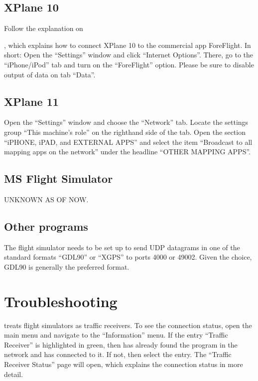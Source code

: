 \documentclass[letterpaper,10pt,english]{sphinxmanual}
\begin{document}
\subsection{X\sphinxhyphen{}Plane 10}
\label{\detokenize{02-steps/simulator:id1}}
\sphinxAtStartPar
Follow the explanation on %
\begin{footnote}[17]\sphinxAtStartFootnote
{}
%
\end{footnote},
which explains how to connect X\sphinxhyphen{}Plane 10 to the commercial app ForeFlight.  In
short: Open the “Settings” window and click “Internet Options”. There, go to the
“iPhone/iPod” tab and turn on the “ForeFlight” option.  Please be sure to
disable output of data on tab “Data”.

\noindent{}


\subsection{X\sphinxhyphen{}Plane 11}
\label{\detokenize{02-steps/simulator:id2}}
\sphinxAtStartPar
Open the “Settings” window and choose the “Network” tab.  Locate the settings
group “This machine’s role” on the right\sphinxhyphen{}hand side of the tab. Open the section
“iPHONE, iPAD, and EXTERNAL APPS” and select the item “Broadcast to all mapping
apps on the network” under the headline “OTHER MAPPING APPS”.

\noindent{}


\subsection{MS Flight Simulator}
\label{\detokenize{02-steps/simulator:ms-flight-simulator}}
\sphinxAtStartPar
UNKNOWN AS OF NOW.


\subsection{Other programs}
\label{\detokenize{02-steps/simulator:other-programs}}
\sphinxAtStartPar
The flight simulator needs to be set up to send UDP datagrams in one of the
standard formats “GDL90” or “XGPS” to ports 4000 or 49002.  Given the choice,
GDL90 is generally the preferred format.


\section{Troubleshooting}
\label{\detokenize{02-steps/simulator:troubleshooting}}
\sphinxAtStartPar
{} treats flight simulators as traffic receivers.  To
see the connection status, open the main menu and navigate to the “Information”
menu.  If the entry “Traffic Receiver” is highlighted in green, then  has already found the program in the network and has
connected to it.  If not, then select the entry. The “Traffic Receiver Status”
page will open, which explains the connection status in more detail.
\end{document}
